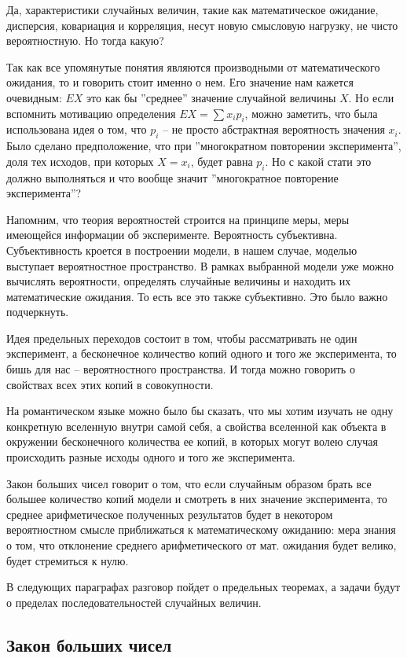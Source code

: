 \documentclass[a4paper,12pt]{article}
\begin{document}
Да, характеристики случайных величин, такие как математическое ожидание, дисперсия, ковариация и корреляция, несут новую смысловую нагрузку, не чисто вероятностную. Но тогда какую?

Так как все упомянутые понятия являются производными от математического ожидания, то и говорить стоит именно о нем. Его значение нам кажется очевидным: $EX$ это как бы ''среднее'' значение случайной величины $X$. Но если вспомнить мотивацию определения $EX = \sum x_i p_i$, можно заметить, что была использована идея о том, что $p_i$ -- не просто абстрактная вероятность значения $x_i$. Было сделано предположение, что при ''многократном повторении эксперимента'', доля тех исходов, при которых $X=x_i$, будет равна $p_i$. Но с какой стати это должно выполняться и что вообще значит ''многократное повторение эксперимента''?

Напомним, что теория вероятностей строится на принципе меры, меры имеющейся информации об эксперименте. Вероятность субъективна. Субъективность кроется в построении модели, в нашем случае, моделью выступает вероятностное пространство. В рамках выбранной модели уже можно вычислять вероятности, определять случайные величины и находить их математические ожидания. То есть все это также субъективно. Это было важно подчеркнуть.

Идея предельных переходов состоит в том, чтобы рассматривать не один эксперимент, а бесконечное количество копий одного и того же эксперимента, то бишь для нас -- вероятностного пространства. И тогда можно говорить о свойствах всех этих копий в совокупности.

На романтическом языке можно было бы сказать, что мы хотим изучать не одну конкретную вселенную внутри самой себя, а свойства вселенной как объекта в окружении бесконечного количества ее копий, в которых могут волею случая происходить разные исходы одного и того же эксперимента.

Закон больших чисел говорит о том, что если случайным образом брать все большее количество копий модели и смотреть в них значение эксперимента, то среднее арифметическое полученных результатов будет в некотором вероятностном смысле приближаться к математическому ожиданию: мера знания о том, что отклонение среднего арифметического от мат. ожидания будет велико, будет стремиться к нулю.

В следующих параграфах разговор пойдет о предельных теоремах, а задачи будут о пределах последовательностей случайных величин.

\subsection*{Закон больших чисел}
\end{document}
